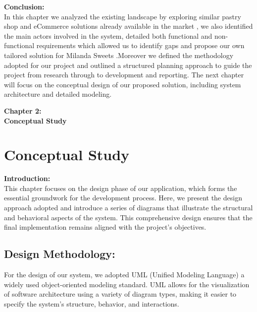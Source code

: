 {\Large \textbf{Conclusion:}}\\

In this chapter we analyzed the existing landscape by exploring similar pastry shop and eCommerce solutions already available in the market , we also identified the main actors involved in the system, detailed both functional and non-functional requirements which allowed us to identify gaps and propose our own tailored solution for Milanda Sweets .Moreover we defined the methodology adopted for our project and outlined a structured planning approach to guide the project from research through to development and reporting.
The next chapter will focus on the conceptual design of our proposed solution, including system architecture and detailed modeling.

\newpage
\thispagestyle{empty}
\vspace*{\fill}
\begin{center}
    {\Huge \textbf{Chapter 2:}}\\[0.8cm]
    {\Huge \textbf{Conceptual Study}}
\end{center}
\vspace*{\fill}


\chapter{Conceptual Study}

{\Large \textbf{Introduction:}}\\

This chapter focuses on the design phase of our application, which forms the essential groundwork for the development process. Here, we present the design approach adopted and introduce a series of diagrams that illustrate the structural and behavioral aspects of the system. This comprehensive design ensures that the final implementation remains aligned with the project’s objectives.

\section{Design Methodology:}

For the design of our system, we adopted UML (Unified Modeling Language) a widely used object-oriented modeling standard. UML allows for the visualization of software architecture using a variety of diagram types, making it easier to specify the system’s structure, behavior, and interactions.\\


